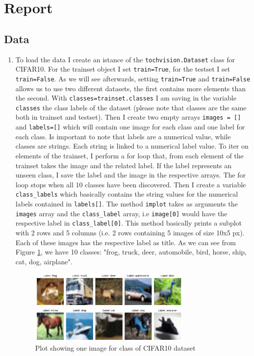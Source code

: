 \documentclass[a4paper]{article}
\begin{document}
\section*{Report}
\subsection{Data}
\begin{enumerate}
    \item To load the data I create an istance of the \texttt{tochvision.Dataset} class for CIFAR10. For the trainset object I set \texttt{train=True}, for the testset I set \texttt{train=False}. As we will see afterwards, setting \texttt{train=True} and \texttt{train=False} allows us to use two different datasets, the first contains more elements than the second. \newline With \texttt{classes=trainset.classes} I am saving in the variable \texttt{classes} the class labels of the dataset (please note that classes are the same both in trainset and testset). Then I create two empty arrays \texttt{images = []} and \texttt{labels=[]} which will contain one image for each class and one label for each class. Is important to note that labels are a numerical value, while classes are strings. Each string is linked to a numerical label value. \newline To iter on elements of the trainset, I perform a for loop that, from each element of the trainset takes the image and the related label. If the label represents an unseen class, I save the label and the image in the respective arrays. The for loop stops when all 10 classes have been discovered. \newline Then I create a variable \texttt{class\_labels} which basically contains the string values for the numerical labels contained in \texttt{labels[]}. \newline The method \texttt{implot} takes as arguments the \texttt{images} array and the \texttt{class\_label} array, i.e \texttt{image[0]} would have the respective label in \texttt{class\_label[0]}. This method basically prints a subplot with 2 rows and 5 columns (i.e. 2 rows containing 5 images of size 10x5 px). Each of these images has the respective label as title. As we can see from Figure \ref{fig:imgplot}, we have 10 classes: "frog, truck, deer, automobile, bird, horse, ship, cat, dog, airplane".

    \begin{figure}[h]
        \centering
        \includegraphics[width=0.75\textwidth]{images/imgplot.png}
        \caption{Plot showing one image for class of CIFAR10 dataset}
        \label{fig:imgplot}
    \end{figure}


\end{enumerate}
\end{document}
